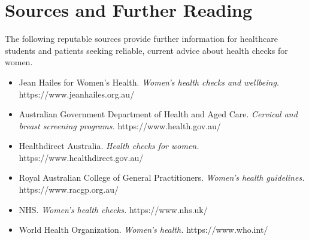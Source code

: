 \section*{Sources and Further Reading}
The following reputable sources provide further information for healthcare students and patients seeking reliable, current advice about health checks for women.

\begin{itemize}
    \item Jean Hailes for Women's Health. \textit{Women's health checks and wellbeing.} https://www.jeanhailes.org.au/
    \item Australian Government Department of Health and Aged Care. \textit{Cervical and breast screening programs.} https://www.health.gov.au/
    \item Healthdirect Australia. \textit{Health checks for women.} https://www.healthdirect.gov.au/
    \item Royal Australian College of General Practitioners. \textit{Women's health guidelines.} https://www.racgp.org.au/
    \item NHS. \textit{Women's health checks.} https://www.nhs.uk/
    \item World Health Organization. \textit{Women's health.} https://www.who.int/
\end{itemize}
